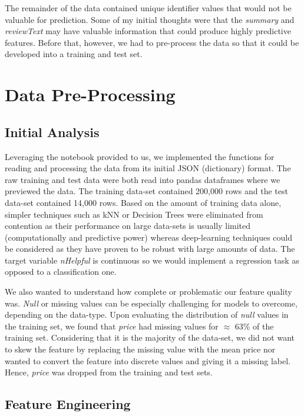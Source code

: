 \documentclass[12pt]{article}
\theoremstyle{plain}
\theoremstyle{definition}
\numberwithin{equation}{theorem}
\begin{document}
\bigskip
The remainder of the data contained unique identifier values that would not be valuable for prediction. Some of my initial thoughts were that the \textit{summary} and \textit{reviewText} may have valuable information that could produce highly predictive features. Before that, however, we had to pre-process the data so that it could be developed into a training and test set.

\section{Data Pre-Processing}
\subsection{Initial Analysis}

Leveraging the notebook provided to us, we implemented the functions for reading and processing the data from its initial JSON (dictionary) format. The raw training and test data were both read into pandas dataframes where we previewed the data. The training data-set contained 200,000 rows and the test data-set contained 14,000 rows. Based on the amount of training data alone, simpler techniques such as kNN or Decision Trees were eliminated from contention as their performance on large data-sets is usually limited (computationally and predictive power) whereas deep-learning techniques could be considered as they have proven to be robust with large amounts of data. The target variable \textit{nHelpful} is continuous so we would implement a regression task as opposed to a classification one.

\bigskip
We also wanted to understand how complete or problematic our feature quality was. \textit{Null} or missing values can be especially challenging for models to overcome, depending on the data-type. Upon evaluating the distribution of \textit{null} values in the training set, we found that \textit{price} had missing values for $\approx$ 63\% of the training set. Considering that it is the majority of the data-set, we did not want to skew the feature by replacing the missing value with the mean price nor wanted to convert the feature into discrete values and giving it a missing label. Hence, \textit{price} was dropped from the training and test sets.

\subsection{Feature Engineering}
\end{document}
